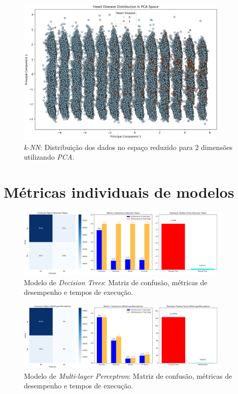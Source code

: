 \begin{figure}[H]
    \centering
    \includegraphics[width=0.9\textwidth]{images/knn_pca.png}
    \caption{\textit{k-NN}: Distribuição dos dados no espaço reduzido para 2 dimensões utilizando \textit{PCA}.}
    \label{fig:knn_pca}
\end{figure}

\section{Métricas individuais de modelos}
\begin{figure}[H]
    \centering
    \includegraphics[width=0.9\textwidth]{images/decision_tree_overview.png}
    \caption{Modelo de \textit{Decision Trees}: Matriz de confusão, métricas de desempenho e tempos de execução.}
    \label{fig:decision_tree_overview}
\end{figure}

\begin{figure}[H]
    \centering
    \includegraphics[width=0.9\textwidth]{images/mlp_overview.png}
    \caption{Modelo de \textit{Multi-layer Perceptron}: Matriz de confusão, métricas de desempenho e tempos de execução.}
    \label{fig:mlp_overview}
\end{figure}

